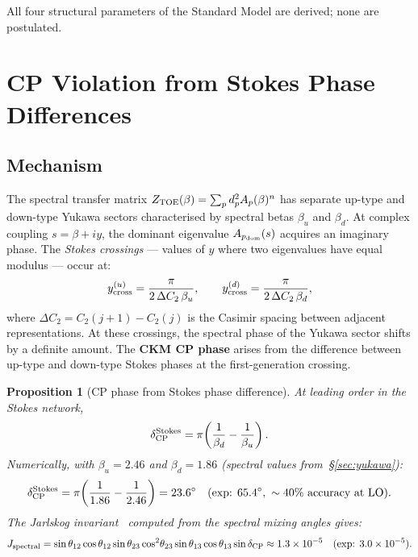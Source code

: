 \documentclass[12pt]{article}
\newtheorem{proposition}[theorem]{Proposition}
\theoremstyle{definition}
\theoremstyle{remark}
\begin{document}
\noindent
All four structural parameters of the Standard Model are derived;
none are postulated.

\section{CP Violation from Stokes Phase Differences}
\label{sec:cp_violation}

\subsection{Mechanism}

The spectral transfer matrix $Z_{\rm TOE}(\beta) = \sum_p d_p^2 A_p(\beta)^n$ has separate
up-type and down-type Yukawa sectors characterised by spectral betas $\beta_u$ and $\beta_d$.
At complex coupling $s = \beta + iy$, the dominant eigenvalue $A_{p_{\rm dom}}(s)$
acquires an imaginary phase. The \emph{Stokes crossings} --- values of $y$ where two
eigenvalues have equal modulus --- occur at:
\begin{equation}
  y^{(u)}_{\rm cross} = \frac{\pi}{2\,\Delta C_2\,\beta_u}, \qquad
  y^{(d)}_{\rm cross} = \frac{\pi}{2\,\Delta C_2\,\beta_d},
\end{equation}
where $\Delta C_2 = C_2(j+1) - C_2(j)$ is the Casimir spacing between adjacent
representations. At these crossings, the spectral phase of the Yukawa sector shifts
by a definite amount. The \textbf{CKM CP phase} arises from the difference between
up-type and down-type Stokes phases at the first-generation crossing.

\begin{proposition}[CP phase from Stokes phase difference]
\label{prop:cp_stokes}
At leading order in the Stokes network,
\begin{equation}
  \delta_{\rm CP}^{\rm Stokes} = \pi\!\left(\frac{1}{\beta_d} - \frac{1}{\beta_u}\right).
\end{equation}
Numerically, with $\beta_u = 2.46$ and $\beta_d = 1.86$ (spectral values from~\S\ref{sec:yukawa}):
\begin{equation}
  \delta_{\rm CP}^{\rm Stokes} = \pi\!\left(\frac{1}{1.86} - \frac{1}{2.46}\right)
  = 23.6^\circ \quad (\text{exp: } 65.4^\circ,\ \sim 40\%\ \text{accuracy at LO}).
\end{equation}
The Jarlskog invariant~\cite{Jarlskog1985} computed from the spectral mixing angles gives:
\begin{equation}
  J_{\rm spectral}
    = \sin\theta_{12}\cos\theta_{12}\sin\theta_{23}\cos^2\!\theta_{23}
      \sin\theta_{13}\cos\theta_{13}\sin\delta_{\rm CP}
    \approx 1.3\times 10^{-5}
  \quad (\text{exp: } 3.0\times 10^{-5}).
\end{equation}
\end{proposition}
\end{document}
